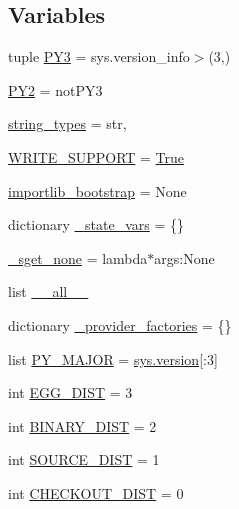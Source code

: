 \subsection*{Variables}
\begin{DoxyCompactItemize}
\item 
tuple \hyperlink{namespacepkg__resources_a9178a93fe70a0df259673cb208f11462}{P\+Y3} = sys.\+version\+\_\+info$>$(3,)
\item 
\hyperlink{namespacepkg__resources_a3b9bf3a3274fead6d2bebfeaf324ade8}{P\+Y2} = not\+P\+Y3
\item 
\hyperlink{namespacepkg__resources_a27c827d64393f703088abdd389e918fc}{string\+\_\+types} = str,
\item 
\hyperlink{namespacepkg__resources_a8cba25e3f73d53602d7f99bdba45d768}{W\+R\+I\+T\+E\+\_\+\+S\+U\+P\+P\+O\+R\+T} = \hyperlink{libqhull_8h_add3ca9eefe3b5b754426f51d3043e579}{True}
\item 
\hyperlink{namespacepkg__resources_aa5ed332c97cdf6c3a282f990051a01a8}{importlib\+\_\+bootstrap} = None
\item 
dictionary \hyperlink{namespacepkg__resources_a8bb0d8bc0c3aa5909d1b8e3b499517e5}{\+\_\+state\+\_\+vars} = \{\}
\item 
\hyperlink{namespacepkg__resources_a2cf08823d21b08f10acae9ae4206e3ee}{\+\_\+sget\+\_\+none} = lambda$\ast$args\+:\+None
\item 
list \hyperlink{namespacepkg__resources_a43c5447133cb244ad4d7947989de78d1}{\+\_\+\+\_\+all\+\_\+\+\_\+}
\item 
dictionary \hyperlink{namespacepkg__resources_a6be66cecb4a61efdf49afce30b661e2b}{\+\_\+provider\+\_\+factories} = \{\}
\item 
list \hyperlink{namespacepkg__resources_a0b3b152e2167baf5127f1f1d40d9bbbe}{P\+Y\+\_\+\+M\+A\+J\+O\+R} = \hyperlink{constants_8h_a6418e155daa9be25a885791f11c31dbe}{sys.\+version}\mbox{[}\+:3\mbox{]}
\item 
int \hyperlink{namespacepkg__resources_a6710a7d7eb62b157b3d75a3c79b48c01}{E\+G\+G\+\_\+\+D\+I\+S\+T} = 3
\item 
int \hyperlink{namespacepkg__resources_a58feeedc42610e3784dd6ee321d7cdfc}{B\+I\+N\+A\+R\+Y\+\_\+\+D\+I\+S\+T} = 2
\item 
int \hyperlink{namespacepkg__resources_a01daed33b49fd789a3b4677cea50dd53}{S\+O\+U\+R\+C\+E\+\_\+\+D\+I\+S\+T} = 1
\item 
int \hyperlink{namespacepkg__resources_ac18133cb42656103587b079dfddb0570}{C\+H\+E\+C\+K\+O\+U\+T\+\_\+\+D\+I\+S\+T} = 0
\item 

\end{DoxyCompactItemize}
